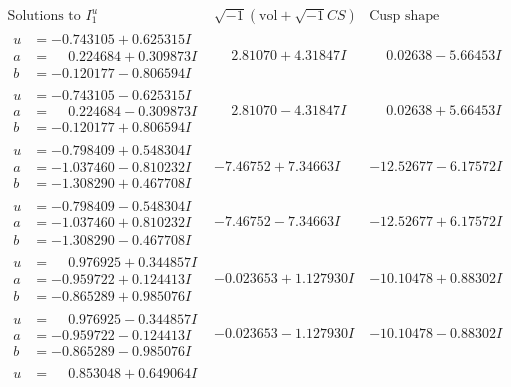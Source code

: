\documentclass[1p]{elsarticle_modified}
\theoremstyle{definition}
\newcommand{\I}{\sqrt{-1}}
\begin{document}
$$\begin{array}{c|c|c}  
\text{Solutions to }I^u_{1}& \I (\text{vol} + \sqrt{-1}CS) & \text{Cusp shape}\\
 \hline 
\begin{aligned}
u &= -0.743105 + 0.625315 I \\
a &= \phantom{-}0.224684 + 0.309873 I \\
b &= -0.120177 - 0.806594 I\end{aligned}
 & \phantom{-}2.81070 + 4.31847 I & \phantom{-}0.02638 - 5.66453 I \\ \hline\begin{aligned}
u &= -0.743105 - 0.625315 I \\
a &= \phantom{-}0.224684 - 0.309873 I \\
b &= -0.120177 + 0.806594 I\end{aligned}
 & \phantom{-}2.81070 - 4.31847 I & \phantom{-}0.02638 + 5.66453 I \\ \hline\begin{aligned}
u &= -0.798409 + 0.548304 I \\
a &= -1.037460 - 0.810232 I \\
b &= -1.308290 + 0.467708 I\end{aligned}
 & -7.46752 + 7.34663 I & -12.52677 - 6.17572 I \\ \hline\begin{aligned}
u &= -0.798409 - 0.548304 I \\
a &= -1.037460 + 0.810232 I \\
b &= -1.308290 - 0.467708 I\end{aligned}
 & -7.46752 - 7.34663 I & -12.52677 + 6.17572 I \\ \hline\begin{aligned}
u &= \phantom{-}0.976925 + 0.344857 I \\
a &= -0.959722 + 0.124413 I \\
b &= -0.865289 + 0.985076 I\end{aligned}
 & -0.023653 + 1.127930 I & -10.10478 + 0.88302 I \\ \hline\begin{aligned}
u &= \phantom{-}0.976925 - 0.344857 I \\
a &= -0.959722 - 0.124413 I \\
b &= -0.865289 - 0.985076 I\end{aligned}
 & -0.023653 - 1.127930 I & -10.10478 - 0.88302 I \\ \hline\begin{aligned}
u &= \phantom{-}0.853048 + 0.649064 I \\

\end{aligned}
\end{array}$$
\end{document}
